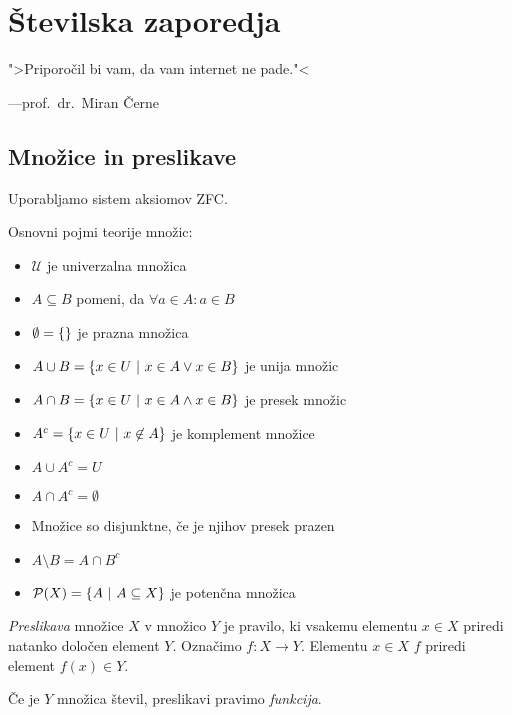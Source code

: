 \documentclass[12pt, a4paper]{article}
\begin{document}
\newpage

\section{Številska zaporedja}

\epigraph{">Priporočil bi vam, da vam internet ne pade."<}{---prof.~dr.~Miran Černe}

\subsection{Množice in preslikave}

Uporabljamo sistem aksiomov ZFC.

\begin{definicija}
Osnovni pojmi teorije množic:

\begin{itemize}
\item $\mathcal{U}$ je univerzalna množica
\item $A\subseteq B$ pomeni, da $\forall a\in A\colon a\in B$
\item $\emptyset=\left\{\right\}$ je prazna množica
\item $A\cup B=\left\{x\in U~\middle\vert~x\in A\vee x\in B\right\}$ je unija množic
\item $A\cap B=\left\{x\in U~\middle\vert~x\in A\wedge x\in B\right\}$ je presek množic
\item $A^c=\left\{x\in U~\middle\vert~x\not\in A\right\}$ je komplement množice
\item $A\cup A^c=U$
\item $A\cap A^c=\emptyset$
\item Množice so disjunktne, če je njihov presek prazen
\item $A\setminus B=A\cap B^c$
\item $\mathcal{P}(X)=\left\{A~\middle\vert~A\subseteq X\right\}$ je potenčna množica
\end{itemize}
\end{definicija}

\begin{okvir}
\begin{definicija}
\emph{Preslikava} množice $X$ v množico $Y$ je pravilo, ki vsakemu elementu $x\in X$ priredi natanko določen element $Y$. Označimo $f\colon X\to Y$. Elementu $x\in X$ $f$ priredi element $f(x)\in Y$.
\end{definicija}
\end{okvir}

\begin{definicija}
Če je $Y$ množica števil, preslikavi pravimo \emph{funkcija}.
\end{definicija}
\end{document}
